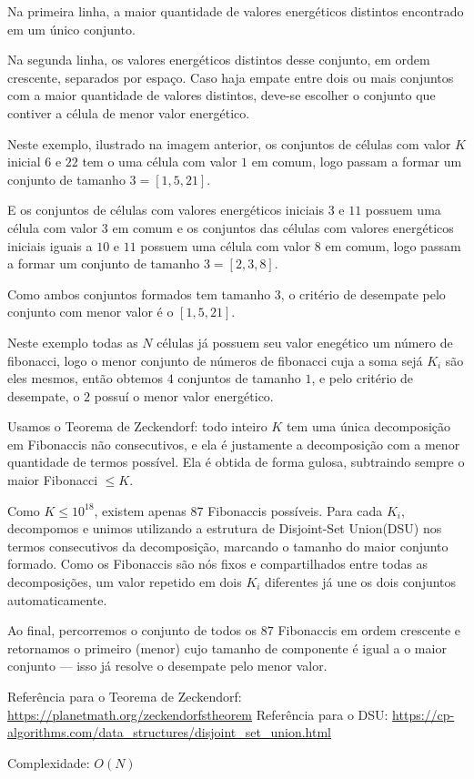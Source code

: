 Na primeira linha, a maior quantidade de valores energéticos distintos encontrado em um único conjunto.

Na segunda linha, os valores energéticos distintos desse conjunto, em ordem crescente, separados por espaço. Caso haja empate entre dois ou mais conjuntos com a maior quantidade de valores distintos, deve-se escolher o conjunto que
contiver a célula de menor valor energético.

Neste exemplo, ilustrado na imagem anterior, os conjuntos de células com valor $K$ inicial $6$ e $22$ tem o uma célula com valor $1$ em comum, logo passam a formar um conjunto de tamanho $3 = [1, 5, 21]$.

E os conjuntos de células com valores energéticos iniciais $3$ e $11$ possuem uma célula com valor $3$ em comum e os conjuntos das células com valores energéticos iniciais iguais a $10$ e $11$ possuem uma célula com valor $8$ em comum, logo passam a formar um conjunto de tamanho $3 = [2, 3, 8]$.

Como ambos conjuntos formados tem tamanho $3$, o critério de desempate pelo conjunto com menor valor é o $[1, 5, 21]$.

Neste exemplo todas as $N$ células já possuem seu valor enegético um número de fibonacci, logo o menor conjunto de números de fibonacci cuja a soma sejá $K_i$ são eles mesmos, então obtemos $4$ conjuntos de tamanho $1$,
e pelo critério de desempate, o $2$ possuí o menor valor energético.

Usamos o Teorema de Zeckendorf: todo inteiro $K$ tem uma
única decomposição em Fibonaccis não consecutivos, e ela é justamente a
decomposição com a menor quantidade de termos possível. Ela é obtida de
forma gulosa, subtraindo sempre o maior Fibonacci $\le K$.

Como $K \le 10^{18}$, existem apenas $87$ Fibonaccis possíveis. Para cada
$K_i$, decompomos e unimos utilizando a estrutura de Disjoint-Set Union(DSU) nos termos consecutivos da
decomposição, marcando o tamanho do maior conjunto formado. Como os Fibonaccis são nós fixos e compartilhados entre
todas as decomposições, um valor repetido em dois $K_i$ diferentes já une os dois conjuntos automaticamente.
 
Ao final, percorremos o conjunto de todos os $87$ Fibonaccis em ordem
crescente e retornamos o primeiro (menor) cujo tamanho de componente é igual
a o maior conjunto — isso já resolve o desempate pelo menor valor.

Referência para o Teorema de Zeckendorf: \url{https://planetmath.org/zeckendorfstheorem}
Referência para o DSU: \url{https://cp-algorithms.com/data_structures/disjoint_set_union.html}
 
Complexidade: $O(N)$
